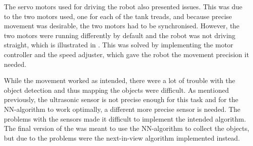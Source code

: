 The servo motors used for driving the robot also presented issues. This was due to the two motors used, one for each of the tank treads, and because precise movement was desirable, the two motors had to be synchronised. However, the two motors were running differently by default and the robot was not driving straight, which is illustrated in . This was solved by implementing the motor controller and the speed adjuster, which gave the robot the movement precision it needed.

While the movement worked as intended, there were a lot of trouble with the object detection and thus mapping the objects were difficult. As mentioned previously, the ultrasonic sensor is not precise enough for this task and for the NN-algorithm to work optimally, a different more precise sensor is needed. The problems with the sensors made it difficult to implement the intended algorithm. The final version of the \projname{} was meant to use the NN-algorithm to collect the objects, but due to the problems were the next-in-view algorithm implemented instead.







